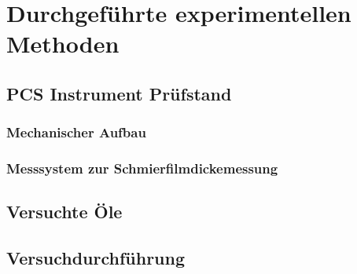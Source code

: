 \chapter{Durchgeführte experimentellen Methoden}
\label{chap:durchgefuehrte_experimentellen_methoden}

\section{PCS Instrument Prüfstand}
\label{sec:pcs_pruefstand}

\subsection{Mechanischer Aufbau}
\label{ssec:mechanischer_aufbau}

\subsection{Messsystem zur Schmierfilmdickemessung}
\label{ssec:messsystem_zur_schmierfilmdickemessung}

\section{Versuchte Öle}
\label{sec:versuchte_oele}

\section{Versuchdurchführung}
\label{sec:versuchdurchfuehrung}
